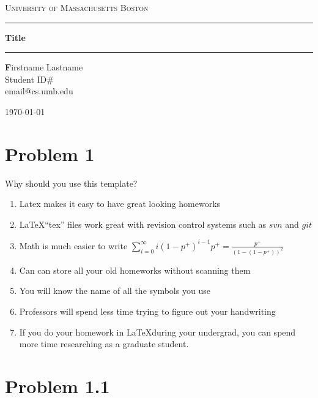 \documentclass[12pt,letterpaper]{article}
\makeatletter
\def\thetitle{Title}
\def\theauthor{Firstname Lastname}
\def\email{email@cs.umb.edu}
\def\studentid{Student ID\#}
\def\thedate{\today}
\def\university{University of Massachusetts Boston}
\makeatother
\begin{document}
\begin{titlepage}
\begin{center}
\textsc{\LARGE \university}\vspace{10mm}
\hrule\vspace{2mm}
\huge\bfseries\thetitle\vspace{2mm}
\hrule\vspace{10mm}
\end{center}
\begin{flushleft}
\textbf\theauthor\\
\studentid\\
\email\\

\end{flushleft}
\vfill
\begin{center}
\thedate
\end{center}
\end{titlepage}

\newpage


\section*{Problem 1}

Why should you use this template?

\begin{enumerate}
  \item Latex makes it easy to have great looking homeworks
  \item \LaTeX ``tex'' files work great with revision control systems such as
  $svn$ and $git$
  \item Math is much easier to write $\displaystyle\sum_{i=0}^\infty
  i(1-p^+)^{i-1}p^+ = \frac{p^+}{(1-(1-p^+))^2}$
  \item Can can store all your old homeworks without scanning them
  \item You will know the name of all the symbols you use
  \item Professors will spend less time trying to figure out your handwriting
  \item If you do your homework in \LaTeX during your undergrad, you can spend
  more time researching as a graduate student.
\end{enumerate}

\section*{Problem 1.1}
\end{document}
